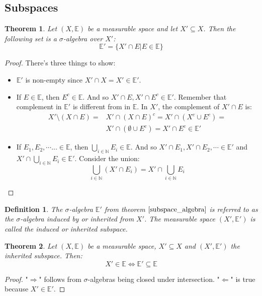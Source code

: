 \documentclass[12pt, a4paper]{article}
\newtheorem{theorem}{Theorem}[section]
\newtheorem{definition}{Definition}[section]
\numberwithin{equation}{section}
\begin{document}
\subsection{Subspaces}
\begin{theorem}
\label{subspace_algebra}
Let $(X,\mathbb{E})$ be a measurable space and let $X'\subseteq X$. Then the following set is a $\sigma$-algebra over $X'$:
\begin{equation}
\mathbb{E}'=\{X'\cap E|E\in\mathbb{E}\}
\end{equation}
\end{theorem}
\begin{proof}
There's three things to show:
\begin{itemize}
\item $\mathbb{E}'$ is non-empty since $X'\cap X=X'\in\mathbb{E}'$.
\item If $E\in\mathbb{E}$, then $E^c\in\mathbb{E}$. And so $X'\cap E, X'\cap E^c\in\mathbb{E}'$. Remember that complement in $\mathbb{E}'$ is different from in $\mathbb{E}$. In $X'$, the complement of $X'\cap E$ is:
\begin{align}
X'\setminus(X\cap E)=& X'\cap(X\cap E)^c=X'\cap(X^c\cup E^c)=\\
& X'\cap(\emptyset\cup E^c)=X'\cap E^c\in\mathbb{E}'
\end{align}
\item If $E_1, E_2,\cdots ...\in\mathbb{E}$, then $\bigcup_{i\in\mathbb{N}}E_i\in\mathbb{E}$. And so $X'\cap E_1, X'\cap E_2,\cdots\in\mathbb{E}'$ and $X'\cap\bigcup_{i\in\mathbb{N}}E_i\in\mathbb{E}'$. Consider the union:
\begin{equation}
\bigcup_{i\in\mathbb{N}}(X'\cap E_i)=X'\cap\bigcup_{i\in\mathbb{N}}E_i
\end{equation}
\end{itemize}
\end{proof}

\begin{definition}
The $\sigma$-algebra $\mathbb{E}'$ from theorem $\ref{subspace_algebra}$ is referred to as the $\sigma$-algebra induced by or inherited from $X'$. The measurable space $(X',\mathbb{E}')$ is called the induced or inherited subspace.
\end{definition}

\begin{theorem}
Let $(X,\mathbb{E})$ be a measurable space, $X'\subseteq X$ and $(X',\mathbb{E}')$ the inherited subspace. Then:
\begin{equation}
X'\in\mathbb{E}\Leftrightarrow\mathbb{E}'\subseteq\mathbb{E}
\end{equation}
\end{theorem}
\begin{proof}
"$\Rightarrow$" follows from $\sigma$-algebras being closed under intersection. "$\Leftarrow$" is true because $X'\in\mathbb{E}'$.
\end{proof}
\end{document}
